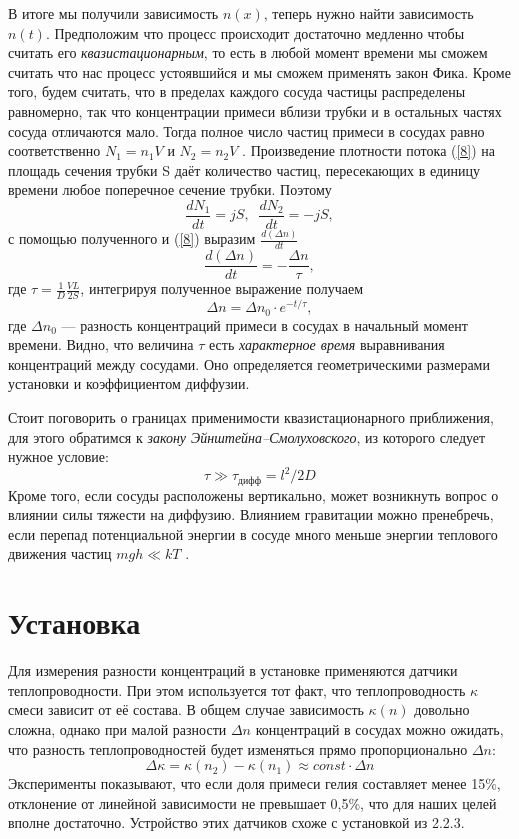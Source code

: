 \documentclass[12 pt, a4paper]{article}%
\begin{document}
В итоге мы получили зависимость $n(x)$, теперь нужно найти зависимость $n(t)$. Предположим что процесс происходит достаточно медленно чтобы считать его \textit{квазистационарным}, то есть в любой момент времени мы сможем считать что нас процесс устоявшийся и мы сможем применять закон Фика. Кроме того, будем считать, что в пределах каждого сосуда частицы распределены равномерно, так что концентрации примеси вблизи трубки и в остальных частях сосуда отличаются мало. Тогда полное число частиц примеси в сосудах равно соответственно $N_1 = n_1 V$ и $N_2 = n_2 V$ . Произведение плотности потока (\ref{8}) на площадь сечения трубки S даёт количество частиц, пересекающих в единицу времени любое поперечное сечение трубки. Поэтому 
\begin{equation*}
    \frac{dN_1}{dt} = jS,\;\; \frac{dN_2}{dt} = - jS, 
\end{equation*}
с помощью полученного и (\ref{8}) выразим $\frac{d(\Delta n)}{dt}$
\begin{equation*}
        \frac{d(\Delta n)}{dt} = - \frac{\Delta n}{\tau},
\end{equation*}
где $\tau = \frac{1}{D} \frac{VL}{2S}$, интегрируя полученное выражение получаем
\begin{equation}\label{9}
    \Delta n = \Delta n_0 \cdot e^{-t/\tau},
\end{equation}
где $\Delta n_0$ — разность концентраций примеси в сосудах в начальный момент времени. Видно, что величина $\tau$ есть \textit{характерное время} выравнивания концентраций между сосудами. Оно определяется геометрическими размерами установки и коэффициентом диффузии.

Стоит поговорить о границах применимости квазистационарного приближения, для этого обратимся к \textit{закону Эйнштейна–Смолуховского}, из которого следует нужное условие: 
\begin{equation}\label{10}
    \tau \gg \tau_{дифф} = l^2 / 2D 
\end{equation}
Кроме того, если сосуды расположены вертикально, может возникнуть вопрос о влиянии силы тяжести на диффузию. Влиянием гравитации можно пренебречь, если перепад потенциальной энергии в сосуде много меньше энергии теплового движения частиц $mgh \ll k T$ . 

\section*{Установка}
Для измерения разности концентраций в установке применяются датчики теплопроводности. При этом используется тот факт, что теплопроводность $\kappa$ смеси зависит от её состава. В общем случае зависимость $\kappa(n)$ довольно сложна, однако при малой разности $\Delta n$ концентраций в сосудах можно ожидать, что разность теплопроводностей будет изменяться прямо пропорционально $\Delta n$:
\begin{equation}\label{11}
    \Delta \kappa = \kappa(n_2) - \kappa(n_1) \approx const \cdot \Delta n
\end{equation}
Эксперименты показывают, что если доля примеси гелия составляет менее 15\%, отклонение от линейной зависимости не превышает 0,5\%, что для наших целей вполне достаточно. Устройство этих датчиков схоже с установкой из 2.2.3. \\
\end{document}

